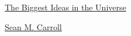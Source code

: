 \documentclass[11pt]{article}
\begin{document}
	\kaishu 
	\setcounter{section}{0}
	\begin{center}
		{\LARGE  \href{https://www.preposterousuniverse.com/biggestideas/}{The Biggest Ideas in the Universe}}
		
		
		{\large \href{https://www.preposterousuniverse.com/}{Sean M. Carroll}}
	\end{center}
\setcounter{page}{1}

\vspace{0.5cm}
\end{document}
